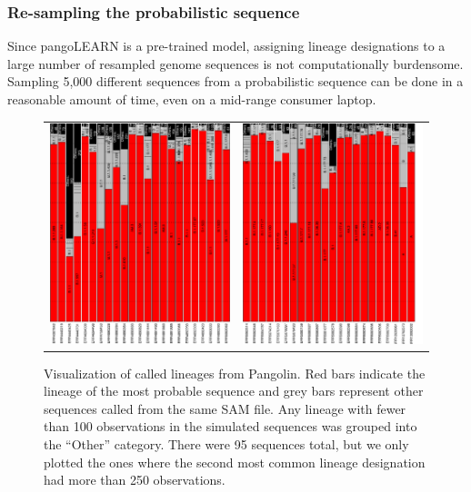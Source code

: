 \documentclass[12pt]{article}
\begin{document}
\subsubsection{Re-sampling the probabilistic sequence}\label{sec:Res1}


Since pangoLEARN is a pre-trained model, assigning lineage designations to a large number of resampled genome sequences is not computationally burdensome.
Sampling 5,000 different sequences from a probabilistic sequence can be done in a reasonable amount of time, even on a mid-range consumer laptop.


\begin{figure}[btp]
\centering

\begin{tabular}{cc}
\includegraphics[width=0.38\linewidth, angle=-90]{figs/sampled_bars1.pdf} & \includegraphics[width=0.38\linewidth, angle=-90]{figs/sampled_bars2.pdf}\\
\end{tabular}

\caption{\label{fig:covidcalls}Visualization of called lineages from Pangolin.
Red bars indicate the lineage of the most probable sequence and grey bars represent other sequences called from the same SAM file.
Any lineage with fewer than 100 observations in the simulated sequences was grouped into the ``Other'' category.
There were 95 sequences total, but we only plotted the ones where the second most common lineage designation had more than 250 observations.}

\end{figure}
\end{document}
